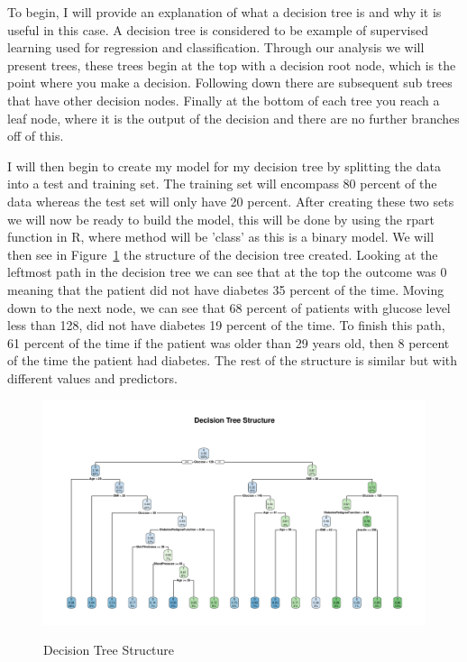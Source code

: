 \documentclass[12pt]{article}
\begin{document}
    To begin, I will provide an explanation of what a decision tree is and why it is useful in this case. A decision tree is considered
    to be example of supervised learning used for regression and classification. Through our analysis we will present trees, these trees
    begin at the top with a decision root node, which is the point where you make a decision. Following down there are subsequent sub trees
    that have other decision nodes. Finally at the bottom of each tree you reach a leaf node, where it is the output of the decision and 
    there are no further branches off of this.  
    
    I will then begin to create my model for my decision tree by
    splitting the data into a test and training set. The training set will encompass 80 percent of the data whereas the test set will
    only have 20 percent. After creating these two sets we will now be ready to build the model, this will be done by using the rpart
    function in R, where method will be 'class' as this is a binary model. We will then see in Figure~\ref{fig:structure} the structure
    of the decision tree created. Looking at the leftmost path in the decision tree we can see that at the top the outcome was 0 meaning 
    that the patient did not have diabetes 35 percent of the time. Moving down to the next node, we can see that 68 percent of patients with
    glucose level less than 128, did not have diabetes 19 percent of the time. To finish this path, 61 percent of the time if the patient was
    older than 29 years old, then 8 percent of the time the patient had diabetes. The rest of the structure is similar but with different 
    values and predictors.

\begin{figure}[tbp]
  \centering
  \caption{Decision Tree Structure}
  \includegraphics[width=\textwidth]{Decision Tree Structure.pdf}
  \label{fig:structure}
  \end{figure}
\end{document}
